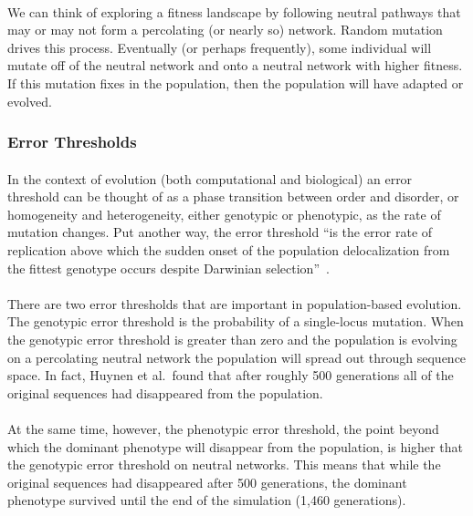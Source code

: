 \documentclass[12pt,letterpaper,titlepage]{article}
\begin{document}
\paragraph{}
We can think of exploring a fitness landscape by following neutral pathways
that may or may not form a percolating (or nearly so) network. Random mutation
drives this process. Eventually (or perhaps frequently), some individual will
mutate off of the neutral network and onto a neutral network with higher
fitness. If this mutation fixes in the population, then the population will
have adapted or evolved.

\subsubsection{Error Thresholds}


\paragraph{}
In the context of evolution (both computational and biological) an error
threshold can be thought of as a phase transition between order and disorder,
or homogeneity and heterogeneity, either genotypic or phenotypic, as the rate
of mutation changes.  Put another way, the error threshold ``is the error rate
of replication above which the sudden onset of the population delocalization
from the fittest genotype occurs despite Darwinian
selection''~\cite{Takeuchi2007}.

\paragraph{}
There are two error thresholds that are important in population-based
evolution. The genotypic error threshold is the probability of a single-locus
mutation. When the genotypic error threshold is greater than zero and the
population is evolving on a percolating neutral network the population will
spread out through sequence space. In fact, Huynen et al.\ found that after
roughly 500 generations all of the original sequences had disappeared from the
population.

\paragraph{}
At the same time, however, the phenotypic error threshold, the point beyond
which the dominant phenotype will disappear from the population, is higher that
the genotypic error threshold on neutral networks. This means that while the
original sequences had disappeared after 500 generations, the dominant
phenotype survived until the end of the simulation (1,460 generations).
\end{document}
